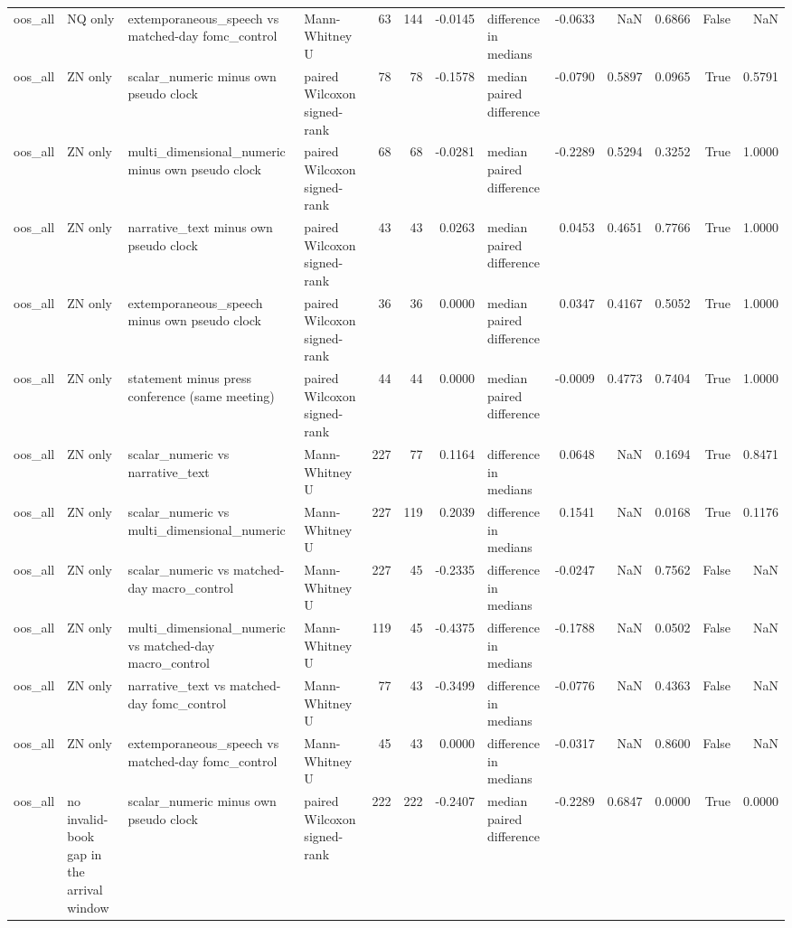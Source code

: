 \begin{tabular}{llllrrrlrrrrr}
oos_all & NQ only & extemporaneous_speech vs matched-day fomc_control & Mann-Whitney U & 63 & 144 & -0.0145 & difference in medians & -0.0633 & NaN & 0.6866 & False & NaN \\
oos_all & ZN only & scalar_numeric minus own pseudo clock & paired Wilcoxon signed-rank & 78 & 78 & -0.1578 & median paired difference & -0.0790 & 0.5897 & 0.0965 & True & 0.5791 \\
oos_all & ZN only & multi_dimensional_numeric minus own pseudo clock & paired Wilcoxon signed-rank & 68 & 68 & -0.0281 & median paired difference & -0.2289 & 0.5294 & 0.3252 & True & 1.0000 \\
oos_all & ZN only & narrative_text minus own pseudo clock & paired Wilcoxon signed-rank & 43 & 43 & 0.0263 & median paired difference & 0.0453 & 0.4651 & 0.7766 & True & 1.0000 \\
oos_all & ZN only & extemporaneous_speech minus own pseudo clock & paired Wilcoxon signed-rank & 36 & 36 & 0.0000 & median paired difference & 0.0347 & 0.4167 & 0.5052 & True & 1.0000 \\
oos_all & ZN only & statement minus press conference (same meeting) & paired Wilcoxon signed-rank & 44 & 44 & 0.0000 & median paired difference & -0.0009 & 0.4773 & 0.7404 & True & 1.0000 \\
oos_all & ZN only & scalar_numeric vs narrative_text & Mann-Whitney U & 227 & 77 & 0.1164 & difference in medians & 0.0648 & NaN & 0.1694 & True & 0.8471 \\
oos_all & ZN only & scalar_numeric vs multi_dimensional_numeric & Mann-Whitney U & 227 & 119 & 0.2039 & difference in medians & 0.1541 & NaN & 0.0168 & True & 0.1176 \\
oos_all & ZN only & scalar_numeric vs matched-day macro_control & Mann-Whitney U & 227 & 45 & -0.2335 & difference in medians & -0.0247 & NaN & 0.7562 & False & NaN \\
oos_all & ZN only & multi_dimensional_numeric vs matched-day macro_control & Mann-Whitney U & 119 & 45 & -0.4375 & difference in medians & -0.1788 & NaN & 0.0502 & False & NaN \\
oos_all & ZN only & narrative_text vs matched-day fomc_control & Mann-Whitney U & 77 & 43 & -0.3499 & difference in medians & -0.0776 & NaN & 0.4363 & False & NaN \\
oos_all & ZN only & extemporaneous_speech vs matched-day fomc_control & Mann-Whitney U & 45 & 43 & 0.0000 & difference in medians & -0.0317 & NaN & 0.8600 & False & NaN \\
oos_all & no invalid-book gap in the arrival window & scalar_numeric minus own pseudo clock & paired Wilcoxon signed-rank & 222 & 222 & -0.2407 & median paired difference & -0.2289 & 0.6847 & 0.0000 & True & 0.0000 \\

\end{tabular}
